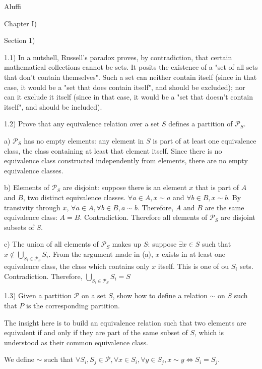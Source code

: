 Aluffi


Chapter I)

Section 1)

1.1) In a nutshell, Russell's paradox proves, by contradiction, that certain mathematical collections cannot be sets. It posits the existence of a "set of all sets that don't contain themselves". Such a set can neither contain itself (since in that case, it would be a "set that does contain itself", and should be excluded); nor can it exclude it itself (since in that case, it would be a "set that doesn't contain itself", and should be included).



1.2) Prove that any equivalence relation over a set $S$ defines a partition of $\mathcal{P}_S$.

a) $\mathcal{P}_S$ has no empty elements: any element in $S$ is part of at least one equivalence class, the class containing at least that element itself. Since there is no equivalence class constructed independently from elements, there are no empty equivalence classes.

b) Elements of $\mathcal{P}_S$ are disjoint: suppose there is an element $x$ that is part of $A$ and $B$, two distinct equivalence classes. $\forall a \in A, x \sim a$ and $\forall b \in B, x \sim b$. By transivity through $x$, $\forall a \in A, \forall b \in B, a \sim b$. Therefore, $A$ and $B$ are the same equivalence class: $A = B$. Contradiction. Therefore all elements of $\mathcal{P}_S$ are disjoint subsets of $S$.

c) The union of all elements of $\mathcal{P}_S$ makes up $S$: suppose $\exists x \in S$ such that $x \notin \bigcup_{S_i \in \mathcal{P}_S} S_i$. From the argument made in (a), $x$ exists in at least one equivalence class, the class which contains only $x$ itself. This is one of ou $S_i$ sets. Contradiction. Therefore, $\bigcup_{S_i \in \mathcal{P}_S} S_i = S$



1.3) Given a partition $\mathcal{P}$ on a set $S$, show how to deﬁne a relation $\sim$ on $S$ such that $P$ is the corresponding partition.

The insight here is to build an equivalence relation such that two elements are equivalent if and only if they are part of the same subset of $S$, which is understood as their common equivalence class.

We define $\sim$ such that $\forall S_i, S_j \in \mathcal{P}, \forall x \in S_i, \forall y \in S_j, x \sim y \Leftrightarrow S_i = S_j$.

